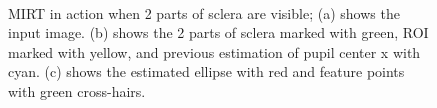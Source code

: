 \begin{figure}[!h]
\begin{dBox}
	\mbox{
	\centering
	}
   \caption{MIRT in action when 2 parts of sclera are visible; (a) shows the input image. (b) shows the 2 parts of sclera marked with green, ROI marked with yellow, and previous estimation of pupil center x with cyan. (c) shows the estimated ellipse with red and feature points with green cross-hairs. \label{fig:mirt_2p} }      
\end{dBox}   
\end{figure}



